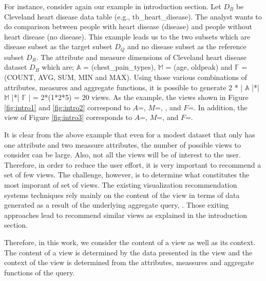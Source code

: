 For instance, consider again our example in introduction section. Let $D_B$ be Cleveland heart disease data table (e.g., tb\_heart\_disease). The analyst wants to do comparison between people with heart disease (disease) and people without heart disease (no disease). This example leads us to the two subsets which are disease subset as the target subset $D_Q$ and no disease subset as the reference subset $D_R$.
The attribute and measure dimensions of Cleveland heart disease dataset $D_B$ which are; $\mathbb{A}$ =  (chest\_pain\_types), $\mathbb{M}$ = (age, oldpeak) and $\mathbb{F}$ = (COUNT, AVG, SUM, MIN and MAX). 
Using those various combinations of attributes, measures and aggregate functions, it is possible to generate 2 * | $\mathbb{A}$ |*| $\mathbb{M}$ |*| $\mathbb{F}$ | = 2*(1*2*5) = 20 views. As the example, the views shown in Figure \ref{fig:intro1} and \ref{fig:intro2} correspond to $A$=, $M$=, , and $F$=. In addition, the view of Figure \ref{fig:intro3}  corresponds to $A$=, $M$=, and $F$=.

It is clear from the above example that even for a modest dataset that only has one attribute and two meassure attributes, the number of possible views to consider can be large. Also, not all the views will be of interest to the user. Therefore, in order to reduce the user effort, it is very important to recommend a set of few  views. The challenge, however, is to determine what constitutes the most imporant of set of views. The existing visualization recommendation systems techniques rely mainly on the content of the view in terms of data generated as a result of the underlying aggregate query\cite{Vartak2015}, \cite{Vartak2014}. Those exiting approaches lead to recommend similar views as explained in the introduction section.%

Therefore, in this work, we consider the content of a view as well as its context. The content of a view is determined by the data presented in the view and the context of the view is determined from the attributes, meassures and aggregate functions of the query. 
%
